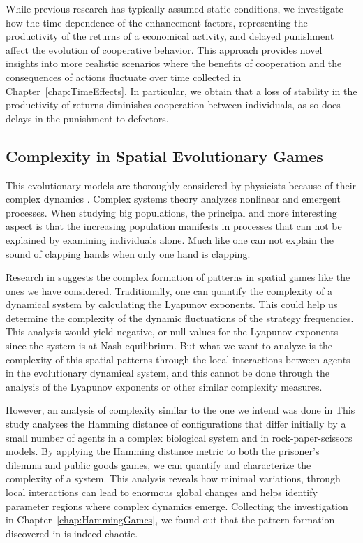 While previous research has typically assumed static conditions, we investigate how the time dependence of the enhancement factors, representing the productivity of the returns of a economical activity, and delayed punishment affect the evolution of cooperative behavior. This approach provides novel insights into more realistic scenarios where the benefits of cooperation and the consequences of actions fluctuate over time collected in Chapter~\ref{chap:TimeEffects}. In particular, we obtain that a loss of stability in the productivity of returns diminishes cooperation between individuals, as so does delays in the punishment to defectors.

\subsection{Complexity in Spatial Evolutionary Games}

This evolutionary models are thoroughly considered by physicists because of their complex dynamics \cite{GamesComplex}. Complex systems theory analyzes nonlinear and emergent processes. When studying big populations, the principal and more interesting aspect is that the increasing population manifests in processes that can not be explained by examining individuals alone. Much like one can not explain the sound of clapping hands when only one hand is clapping.

Research in \cite{SpatialChaos} suggests the complex formation of patterns in spatial games like the ones we have considered. Traditionally, one can quantify the complexity of a dynamical system by calculating the Lyapunov exponents. This could help us determine the complexity of the dynamic fluctuations of the strategy frequencies. This analysis would yield negative, or null values for the Lyapunov exponents since the system is at Nash equilibrium. But what we want to analyze is the complexity of this spatial patterns through the local interactions between agents in the evolutionary dynamical system, and this cannot be done through the analysis of the Lyapunov exponents or other similar complexity measures. 

However, an analysis of complexity similar to the one we intend was done in \cite{HammingChaos1,HammingChaos2} This study analyses the Hamming distance of configurations that differ initially by a small number of agents in a complex biological system and in rock-paper-scissors models. By applying the Hamming distance metric to both the prisoner's dilemma and public goods games, we can quantify and characterize the complexity of a system. This analysis reveals how minimal variations, through local interactions can lead to enormous global changes and helps identify parameter regions where complex dynamics emerge. Collecting the investigation in Chapter~\ref{chap:HammingGames}, we found out that the pattern formation discovered in \cite{SpatialChaos} is indeed chaotic. 

